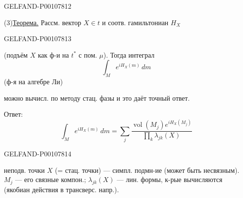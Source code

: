 \begin{GelfandAdjacentEvidence}{GELFAND-P001078}{12}


(3)\quad\uline{Теорема.} Рассм. вектор $X\in t$ и соотв. гамильтониан $H_X$
\end{GelfandAdjacentEvidence}
\begin{GelfandAdjacentEvidence}{GELFAND-P001078}{13}

(подъём $X$ как ф-и на $t^*$ с пом. $\mu$). Тогда интеграл
\begin{equation*}
\int_M e^{iH_X(m)}\,dm
\tag{4}
\end{equation*}
(ф-я на алгебре Ли)

можно вычисл. по методу стац. фазы и это даёт точный ответ.

Ответ:
\begin{equation*}
\int_M e^{iH_X(m)}\,dm
=\sum_j\frac{\operatorname{vol}(M_j)e^{iH_X(M_j)}}
{\prod_k\lambda_{jk}(X)}
\tag{5}
\end{equation*}
\end{GelfandAdjacentEvidence}
\begin{GelfandAdjacentEvidence}{GELFAND-P001078}{14}


неподв. точки $X$ (= стац. точки) — симпл. подмн-ие (может быть несвязным).
$M_j$ — его связные компон.; $\lambda_{jk}(X)$ — лин. формы, к-рые вычисляются
(якобиан действия в трансверс. напр.).
\end{GelfandAdjacentEvidence}



